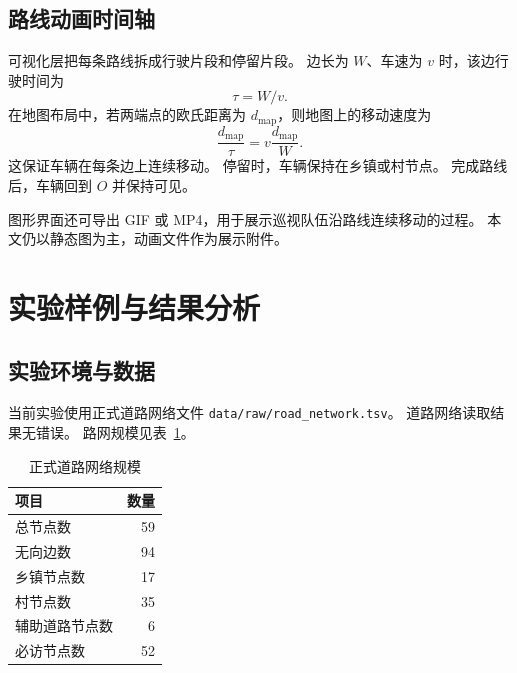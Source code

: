 \documentclass[a4paper, 12pt]{article}
\begin{document}
\subsection{路线动画时间轴}

可视化层把每条路线拆成行驶片段和停留片段。
边长为 $W$、车速为 $v$ 时，该边行驶时间为
\begin{equation}
    \tau = W/v.
\end{equation}
在地图布局中，若两端点的欧氏距离为 $d_{\text{map}}$，则地图上的移动速度为
\begin{equation}
    \frac{d_{\text{map}}}{\tau}
    =
    v\frac{d_{\text{map}}}{W}.
\end{equation}
这保证车辆在每条边上连续移动。
停留时，车辆保持在乡镇或村节点。
完成路线后，车辆回到 $O$ 并保持可见。

图形界面还可导出 GIF 或 MP4，用于展示巡视队伍沿路线连续移动的过程。
本文仍以静态图为主，动画文件作为展示附件。

\section{实验样例与结果分析}

\subsection{实验环境与数据}

当前实验使用正式道路网络文件 \texttt{data/raw/road\_network.tsv}。
道路网络读取结果无错误。
路网规模见表~\ref{tab:network-statistics}。

\begin{table}[H]
    \centering
    \caption{正式道路网络规模}
    \label{tab:network-statistics}
    \begin{tabular}{lr}
        \toprule
        项目 & 数量 \\
        \midrule
        总节点数 & 59 \\
        无向边数 & 94 \\
        乡镇节点数 & 17 \\
        村节点数 & 35 \\
        辅助道路节点数 & 6 \\
        必访节点数 & 52 \\
        \bottomrule
    \end{tabular}
\end{table}
\end{document}
